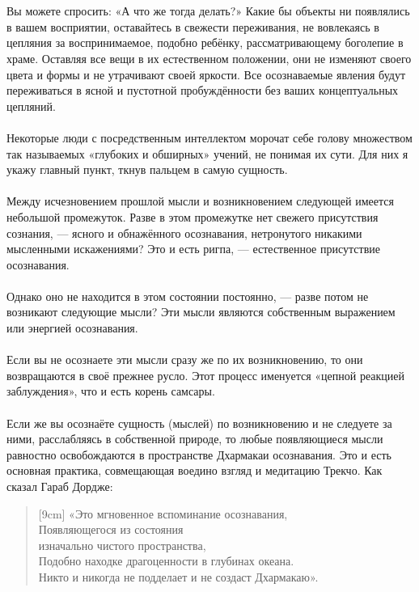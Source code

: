 \\ \\ Вы можете спросить: «А что же тогда делать?» Какие бы объекты ни появлялись в вашем восприятии, оставайтесь в свежести переживания, не вовлекаясь в цепляния за воспринимаемое, подобно ребёнку, рассматривающему боголепие в храме. Оставляя все  вещи в их естественном положении, они не изменяют своего цвета и формы и не утрачивают своей яркости. Все осознаваемые явления будут переживаться в ясной и пустотной пробуждённости без ваших концептуальных цепляний.
\\ \\ Некоторые люди с посредственным интеллектом морочат себе голову множеством так называемых «глубоких и обширных» учений, не понимая их сути. Для них я укажу главный пункт, ткнув пальцем в самую сущность.
\\ \\ Между исчезновением прошлой мысли и возникновением следующей имеется небольшой промежуток. Разве в этом промежутке нет свежего присутствия сознания, — ясного и обнажённого осознавания, нетронутого никакими мысленными искажениями? Это и есть ригпа, — естественное присутствие осознавания.
\\ \\ Однако оно не находится в этом состоянии постоянно, — разве потом не возникают следующие мысли? Эти мысли являются собственным выражением или энергией осознавания.
\\ \\ Если вы не осознаете эти мысли сразу же по их возникновению, то они возвращаются в своё прежнее русло. Этот процесс именуется «цепной реакцией заблуждения», что и есть корень самсары.
\\ \\ Если же вы осознаёте сущность (мыслей) по возникновению и не следуете за ними, расслабляясь в собственной природе, то любые появляющиеся мысли равностно освобождаются в пространстве Дхармакаи осознавания. Это и есть основная практика, совмещающая воедино взгляд и медитацию Трекчо. Как сказал Гараб Дордже:
\begin{verse}[9cm]
«Это мгновенное вспоминание осознавания, \\
Появляющегося из состояния \\ \indent изначально чистого пространства,\\
Подобно находке драгоценности в глубинах океана. \\
Никто и никогда не подделает и не создаст Дхармакаю».
\end{verse}
